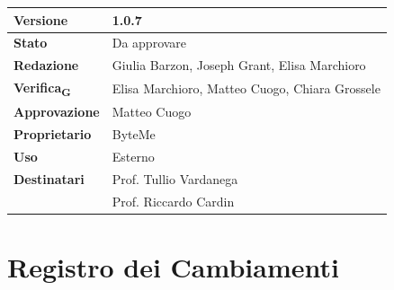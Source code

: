 \documentclass[11pt,a4paper]{article}
\newcommand{\gls}[1]{#1\textsubscript{G}}
\begin{document}
\begin{titlepage}
    \begin{table}[H]
        \centering
        \begin{tabular}{|l|p{5cm}|}
            \hline
            \textbf{Versione} & 1.0.7 \\
            \hline
            \textbf{Stato} & Da approvare \\
            \hline
            \textbf{Redazione} & Giulia Barzon, Joseph Grant, Elisa Marchioro \\
            \hline
            \textbf{\gls{Verifica}} & Elisa Marchioro, Matteo Cuogo, Chiara Grossele \\
            \hline
            \textbf{Approvazione} & Matteo Cuogo \\
            \hline
            \textbf{Proprietario} & ByteMe \\
            \hline
            \textbf{Uso} & Esterno \\
            \hline
            \textbf{Destinatari} & Prof. Tullio Vardanega \\ & Prof. Riccardo Cardin \\
            \hline
        \end{tabular}
    \end{table}
    
    \vfill
\end{titlepage}

\section*{Registro dei Cambiamenti}
\end{document}
